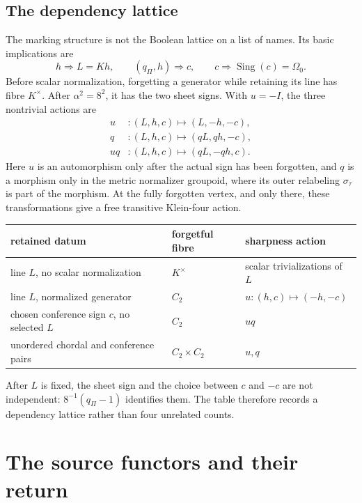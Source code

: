 \documentclass[11pt]{article}
\theoremstyle{definition}
\theoremstyle{remark}
\newcommand{\Sing}{\operatorname{Sing}}
\begin{document}
\subsection{The dependency lattice}

The marking structure is not the Boolean lattice on a list of names.  Its
basic implications are
\[
 h\Rightarrow L=Kh,\qquad (q_\Pi,h)\Rightarrow c,\qquad
 c\Rightarrow\Sing(c)=\Omega_0.
\]
Before scalar normalization, forgetting a generator while retaining its line
has fibre \(K^\times\).  After \(\alpha^2=8^2\), it has the two sheet signs.
With \(u=-I\), the three nontrivial actions are
\[
\begin{aligned}
 u&:(L,h,c)\longmapsto(L,-h,-c),\\
 q&:(L,h,c)\longmapsto(qL,qh,-c),\\
 uq&:(L,h,c)\longmapsto(qL,-qh,c).
\end{aligned}
\]
Here \(u\) is an automorphism only after the actual sign has been forgotten,
and \(q\) is a morphism only in the metric normalizer groupoid, where its
outer relabeling \(\sigma_\tau\) is part of the morphism.
At the fully forgotten vertex, and only there, these transformations give a
free transitive Klein-four action.

\begin{center}
\small
\renewcommand{\arraystretch}{1.18}
\begin{tabular}{@{}p{}p{}p{}@{}}
\toprule
retained datum & forgetful fibre & sharpness action\\
\midrule
line \(L\), no scalar normalization & \(K^\times\) & scalar
  trivializations of \(L\)\\
line \(L\), normalized generator & \(C_2\) & \(u:(h,c)\mapsto(-h,-c)\)\\
chosen conference sign \(c\), no selected \(L\) & \(C_2\) & \(uq\)\\
unordered chordal and conference pairs & \(C_2\times C_2\) & \(u,q\)\\
\bottomrule
\end{tabular}
\end{center}

After \(L\) is fixed, the sheet sign and the choice between \(c\) and \(-c\)
are not independent: \(8^{-1}(q_\Pi-1)\) identifies them.  The table therefore
records a dependency lattice rather than four unrelated counts.

\section{The source functors and their return}
\label{sec:source-return}
\end{document}
